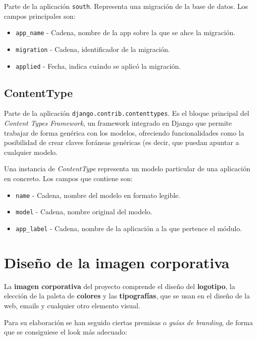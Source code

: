 Parte de la aplicación \texttt{south}. Representa una migración de la base de
datos. Los campos principales son:

\begin{itemize}
\item \texttt{app\_name} - Cadena, nombre de la app sobre la que se ahce la migración.
\item \texttt{migration} - Cadena, identificador de la migración.
\item \texttt{applied} - Fecha, indica cuándo se aplicó la migración.
\end{itemize}

\subsection{ContentType}

Parte de la aplicación \texttt{django.contrib.contenttypes}. Es el bloque
principal del \textit{Content Types Framework}, un framework integrado en Django
que permite trabajar de forma genérica con los modelos, ofreciendo
funcionalidades como la posibilidad de crear claves foráneas genéricas (es
decir, que puedan apuntar a cualquier modelo. 

Una instancia de \textit{ContentType} representa un modelo particular de una
aplicación en concreto. Los campos que contiene son:

\begin{itemize}
\item \texttt{name} - Cadena, nombre del modelo en formato legible.
\item \texttt{model} - Cadena, nombre original del modelo.
\item \texttt{app\_label} - Cadena, nombre de la aplicación a la que pertence el
  módulo.
\end{itemize}

\section{Diseño de la imagen corporativa}

La \textbf{imagen corporativa} del proyecto comprende el diseño del
\textbf{logotipo}, la elección de la paleta de \textbf{colores} y las
\textbf{tipografías}, que se usan en el diseño de la web, emails y cualquier
otro elemento visual.

Para su elaboración se han seguido ciertas premisas o \textit{guías de
  branding}, de forma que se consiguiese el look más adecuado:

